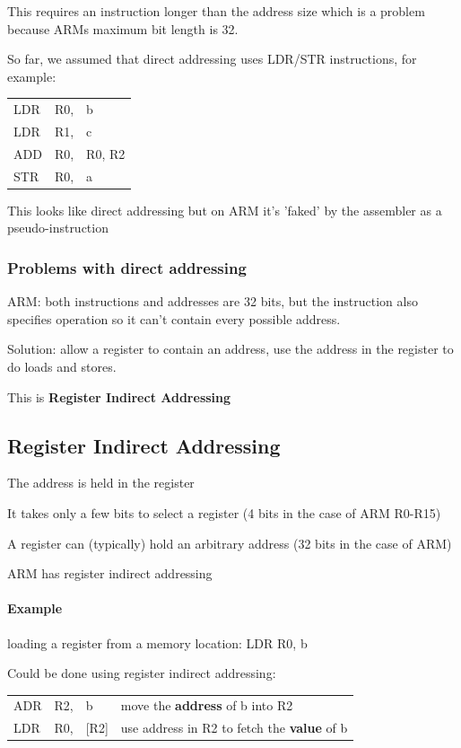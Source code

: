 \documentclass{article}
\begin{document}
This requires an instruction longer than the address size which is a problem because ARMs maximum bit length is 32.

So far, we assumed that direct addressing uses LDR/STR instructions, for example:

\begin{center}
    \begin{tabular}{l l l}
        LDR & R0, & b\\
        LDR & R1, & c\\
        ADD & R0, & R0, R2\\
        STR & R0, & a \\
    \end{tabular}
\end{center}

This looks like direct addressing but on ARM it's 'faked' by the assembler as a pseudo-instruction

\subsubsection{Problems with direct addressing}
ARM: both instructions and addresses are 32 bits, but the instruction also specifies operation so it can't contain every possible address.

Solution: allow a register to contain an address, use the address in the register to do loads and stores.

This is {\bf Register Indirect Addressing}

\subsection{Register Indirect Addressing}
The address is held in the register

It takes only a few bits to select a register (4 bits in the case of ARM R0-R15)

A register can (typically) hold an arbitrary address (32 bits in the case of ARM)

ARM has register indirect addressing

\paragraph{Example}
loading a register from a memory location: LDR R0, b

Could be done using register indirect addressing:

\begin{center}
    \begin{tabular}{l l l l}
        ADR & R2, & b & move the {\bf address} of b into R2\\
        LDR & R0, & [R2] & use address in R2 to fetch the {\bf value} of b\\
    \end{tabular}
\end{center}
\end{document}
